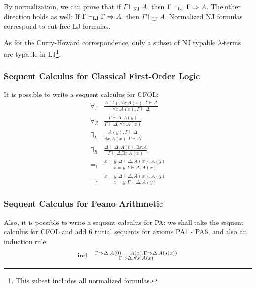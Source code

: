 By normalization, we can prove that if $\Gamma \vdash_\mathrm{NJ} A$, then $\Gamma \vdash_\mathrm{LJ} \Gamma \Rightarrow A$.
The other direction holds as well: If $\Gamma \vdash_\mathrm{LJ} \Gamma \Rightarrow A$, then $\Gamma \vdash_\mathrm{LJ} A$. 
Normalized NJ formulas correspond to cut-free LJ formulas.

As for the Curry-Howard correspondence, only a subset of $\mathrm{NJ}$ typable $\lambda$-terms
are typable in $\mathrm{LJ}$\footnote{This subset includes all normalized formulas.}. 

\subsubsection{Sequent Calculus for Classical First-Order Logic}
It is possible to write a sequent calculus for CFOL:
\[
\begin{array}{cc}
\forall_L& \frac{A(t), \forall x. A(x), \Gamma \vdash \Delta}{\forall x. A(x), \Gamma \vdash \Delta} \\
\forall_R& \frac{\Gamma \vdash \Delta, A(y)}{\Gamma \vdash \Delta, \forall x. A(x)} \\
\exists_L& \frac{A(y), \Gamma \vdash \Delta}{\exists x. A(x), \Gamma \vdash \Delta} \\
\exists_R& \frac{\Delta \vdash \Delta, A(t), \exists x. A}{\Gamma \vdash \Delta. \exists x. A(x)} \\
=_1& \frac{x = y, \Delta \vdash \Delta, A(x), A(y)}{x = y, \Gamma \vdash \Delta, A(x)} \\
=_2& \frac{x = y, \Delta \vdash \Delta, A(x), A(y)}{x = y, \Gamma \vdash \Delta, A(y)}
\end{array}
\]

\subsubsection{Sequent Calculus for Peano Arithmetic}
Also, it is possible to write a sequent calculus for PA: we shall take the sequent calculus
for CFOL and add 6 initial sequents for axioms PA1 - PA6, and also an induction rule:
\[
\begin{array}{cc}
\text{ind}&\frac{\Gamma \Rightarrow \Delta, A(0)~~~~A(x), \Gamma \Rightarrow \Delta, A(s(x))}{\Gamma \Rightarrow \Delta, \forall x. A(x)}
\end{array}
\]

